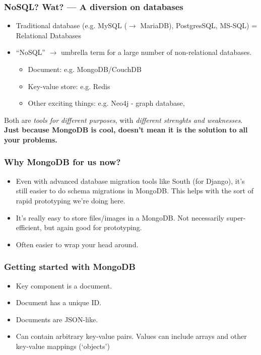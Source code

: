 \documentclass{beamer}
\begin{document}
\begin{frame}
  \frametitle{NoSQL? Wat? --- A diversion on databases}
  \begin{itemize}
  \item Traditional database (e.g. MySQL ($\to$ MariaDB), PostgresSQL, MS-SQL) = Relational Databases
  \item ``NoSQL'' $\to$ umbrella term for a large number of non-relational databases.
    \begin{itemize}
    \item Document: e.g. MongoDB/CouchDB
    \item Key-value store: e.g. Redis
    \item Other exciting things: e.g. Neo4j - graph database, 
    \end{itemize}
  \end{itemize}

  Both are \emph{tools for different purposes}, with \emph{different
    strenghts and weaknesses}. \textbf{Just because MongoDB is cool,
    doesn't mean it is the solution to all your problems.}
\end{frame}

\begin{frame}
  \frametitle{Why MongoDB for us now?}
  \begin{itemize}
  \item Even with advanced database migration tools like South (for
    Django), it's still easier to do schema migrations in
    MongoDB. This helps with the sort of rapid prototyping we're doing here.
  \item It's really easy to store files/images in a
    MongoDB. Not necessarily super-efficient, but again good for
    prototyping.
  \item Often easier to wrap your head around.
  \end{itemize}
\end{frame}

\begin{frame}
  \frametitle{Getting started with MongoDB}

  \begin{itemize}
  \item Key component is a document.
  \item Document has a unique ID.
  \item Documents are JSON-like.
  \item Can contain arbitrary key-value pairs. Values can include
    arrays and other key-value mappings (`objects')
  \end{itemize}
\end{frame}
\end{document}
